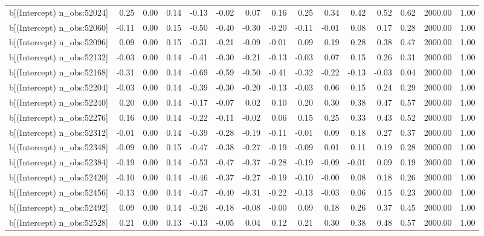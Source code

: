 \begin{table}[ht]
\begin{tabular}{rrrrrrrrrrrrrrr}
  b[(Intercept) n\_obs:52024] & 0.25 & 0.00 & 0.14 & -0.13 & -0.02 & 0.07 & 0.16 & 0.25 & 0.34 & 0.42 & 0.52 & 0.62 & 2000.00 & 1.00 \\ 
  b[(Intercept) n\_obs:52060] & -0.11 & 0.00 & 0.15 & -0.50 & -0.40 & -0.30 & -0.20 & -0.11 & -0.01 & 0.08 & 0.17 & 0.28 & 2000.00 & 1.00 \\ 
  b[(Intercept) n\_obs:52096] & 0.09 & 0.00 & 0.15 & -0.31 & -0.21 & -0.09 & -0.01 & 0.09 & 0.19 & 0.28 & 0.38 & 0.47 & 2000.00 & 1.00 \\ 
  b[(Intercept) n\_obs:52132] & -0.03 & 0.00 & 0.14 & -0.41 & -0.30 & -0.21 & -0.13 & -0.03 & 0.07 & 0.15 & 0.26 & 0.31 & 2000.00 & 1.00 \\ 
  b[(Intercept) n\_obs:52168] & -0.31 & 0.00 & 0.14 & -0.69 & -0.59 & -0.50 & -0.41 & -0.32 & -0.22 & -0.13 & -0.03 & 0.04 & 2000.00 & 1.00 \\ 
  b[(Intercept) n\_obs:52204] & -0.03 & 0.00 & 0.14 & -0.39 & -0.30 & -0.20 & -0.13 & -0.03 & 0.06 & 0.15 & 0.24 & 0.29 & 2000.00 & 1.00 \\ 
  b[(Intercept) n\_obs:52240] & 0.20 & 0.00 & 0.14 & -0.17 & -0.07 & 0.02 & 0.10 & 0.20 & 0.30 & 0.38 & 0.47 & 0.57 & 2000.00 & 1.00 \\ 
  b[(Intercept) n\_obs:52276] & 0.16 & 0.00 & 0.14 & -0.22 & -0.11 & -0.02 & 0.06 & 0.15 & 0.25 & 0.33 & 0.43 & 0.52 & 2000.00 & 1.00 \\ 
  b[(Intercept) n\_obs:52312] & -0.01 & 0.00 & 0.14 & -0.39 & -0.28 & -0.19 & -0.11 & -0.01 & 0.09 & 0.18 & 0.27 & 0.37 & 2000.00 & 1.00 \\ 
  b[(Intercept) n\_obs:52348] & -0.09 & 0.00 & 0.15 & -0.47 & -0.38 & -0.27 & -0.19 & -0.09 & 0.01 & 0.11 & 0.19 & 0.28 & 2000.00 & 1.00 \\ 
  b[(Intercept) n\_obs:52384] & -0.19 & 0.00 & 0.14 & -0.53 & -0.47 & -0.37 & -0.28 & -0.19 & -0.09 & -0.01 & 0.09 & 0.19 & 2000.00 & 1.00 \\ 
  b[(Intercept) n\_obs:52420] & -0.10 & 0.00 & 0.14 & -0.46 & -0.37 & -0.27 & -0.19 & -0.10 & -0.00 & 0.08 & 0.18 & 0.26 & 2000.00 & 1.00 \\ 
  b[(Intercept) n\_obs:52456] & -0.13 & 0.00 & 0.14 & -0.47 & -0.40 & -0.31 & -0.22 & -0.13 & -0.03 & 0.06 & 0.15 & 0.23 & 2000.00 & 1.00 \\ 
  b[(Intercept) n\_obs:52492] & 0.09 & 0.00 & 0.14 & -0.26 & -0.18 & -0.08 & -0.00 & 0.09 & 0.18 & 0.26 & 0.37 & 0.45 & 2000.00 & 1.00 \\ 
  b[(Intercept) n\_obs:52528] & 0.21 & 0.00 & 0.13 & -0.13 & -0.05 & 0.04 & 0.12 & 0.21 & 0.30 & 0.38 & 0.48 & 0.57 & 2000.00 & 1.00 \\ 

\end{tabular}
\end{table}
